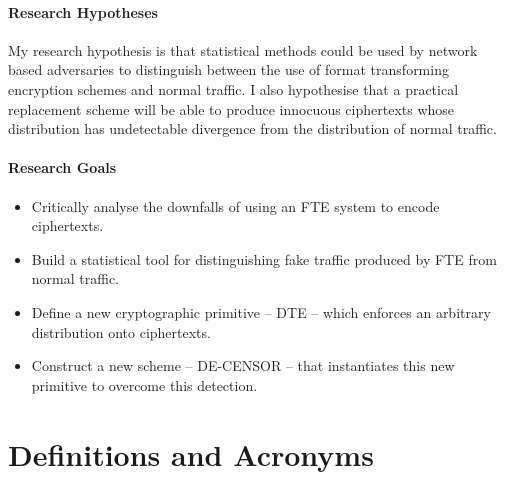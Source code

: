 \documentclass[ %
                    author={Samuel Russell},
                supervisor={Prof. Bogdan Warinschi},
                    degree={MEng},
                     title={Innocuous Ciphertexts},
                  subtitle={The DE-CENSOR Scheme},
                      type={Research},
                      year={2018} ]{dissertation}
\begin{document}
\subsubsection{Research Hypotheses}

My research hypothesis is that statistical methods could be used by network based adversaries to distinguish between the use of format transforming encryption schemes and normal traffic. I also hypothesise that a practical replacement scheme will be able to produce innocuous ciphertexts whose distribution has undetectable divergence from the distribution of normal traffic.

\subsubsection{Research Goals}

\begin{itemize}
\item Critically analyse the downfalls of using an FTE system to encode ciphertexts.
\item Build a statistical tool for distinguishing fake traffic produced by FTE from normal traffic.
\item Define a new cryptographic primitive -- DTE -- which enforces an arbitrary distribution onto ciphertexts.
\item Construct a new scheme -- DE-CENSOR -- that instantiates this new primitive to overcome this detection.
\end{itemize}


\chapter{Definitions and Acronyms}

\vspace{1cm}
\end{document}
